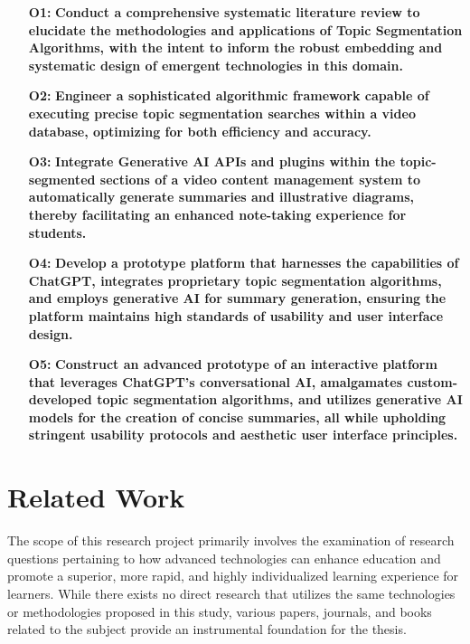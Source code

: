 \begin{enumerate}
    \item[\textbf{O1:}] \textbf{Conduct a comprehensive systematic literature review to elucidate the methodologies and applications of Topic Segmentation Algorithms, with the intent to inform the robust embedding and systematic design of emergent technologies in this domain.}
    \item[\textbf{O2:}] \textbf{Engineer a sophisticated algorithmic framework capable of executing precise topic segmentation searches within a video database, optimizing for both efficiency and accuracy.}
    \item[\textbf{O3:}] \textbf{Integrate Generative AI APIs and plugins within the topic-segmented sections of a video content management system to automatically generate summaries and illustrative diagrams, thereby facilitating an enhanced note-taking experience for students.}
    \item[\textbf{O4:}] \textbf{Develop a prototype platform that harnesses the capabilities of ChatGPT, integrates proprietary topic segmentation algorithms, and employs generative AI for summary generation, ensuring the platform maintains high standards of usability and user interface design.}
    \item[\textbf{O5:}] \textbf{Construct an advanced prototype of an interactive platform that leverages ChatGPT's conversational AI, amalgamates custom-developed topic segmentation algorithms, and utilizes generative AI models for the creation of concise summaries, all while upholding stringent usability protocols and aesthetic user interface principles.}
\end{enumerate}






\section{Related Work}

The scope of this research project primarily involves the examination of research questions pertaining to how advanced technologies can enhance education and promote a superior, more rapid, and highly individualized learning experience for learners. While there exists no direct research that utilizes the same technologies or methodologies proposed in this study, various papers, journals, and books related to the subject provide an instrumental foundation for the thesis.

